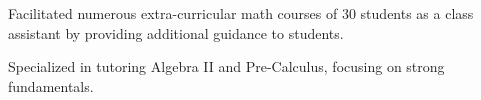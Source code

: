 \documentclass{cultvoucher}
\begin{document}
\begin{tightitemize}
	\item Facilitated numerous extra-curricular math courses of 30 students as
          a class assistant by providing additional guidance to students.
	\item Specialized in tutoring Algebra II and Pre-Calculus, focusing on
          strong fundamentals.
\end{tightitemize}
	
\end{document}
